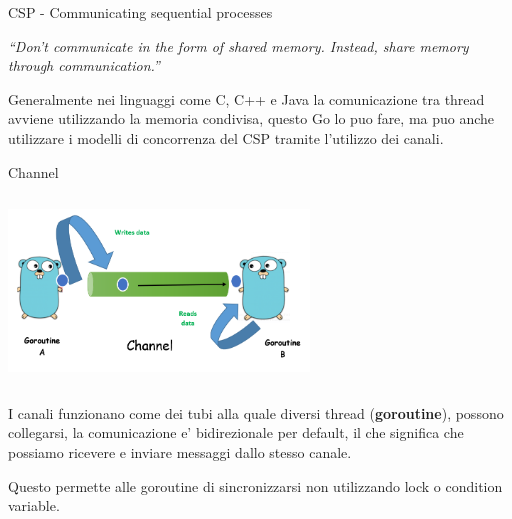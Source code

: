 \documentclass{beamer}
\begin{document}
\begin{frame}{CSP - Communicating sequential processes}

\centering
\textit{“Don’t communicate in the form of shared memory. Instead, share memory
through communication.”}

\vspace{1cm}

Generalmente nei linguaggi come C, C++ e Java la comunicazione tra thread avviene utilizzando la memoria condivisa, questo Go lo puo fare, ma puo anche utilizzare i modelli di concorrenza del CSP tramite l'utilizzo dei canali.
\end{frame}

\begin{frame}{Channel}

\centerline{\includegraphics[width=8cm,height=5cm,keepaspectratio]{goroutine-channel.png}}

I canali funzionano come dei tubi alla quale diversi thread (\textbf{goroutine}), possono collegarsi, la comunicazione e' bidirezionale per default, il che significa che possiamo ricevere e inviare messaggi dallo stesso canale.

\vspace{0.50cm}

\pause

Questo permette alle goroutine di sincronizzarsi non utilizzando lock o condition variable.
    
\end{frame}
\end{document}
